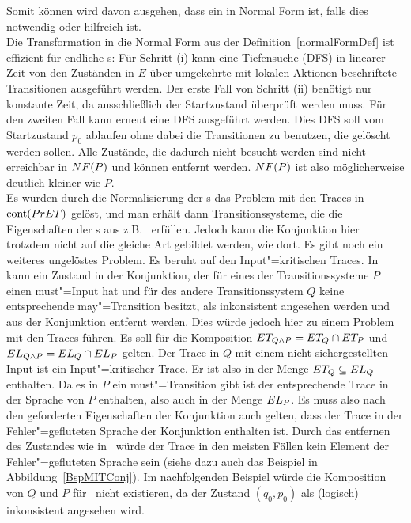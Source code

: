 Somit können wird davon ausgehen, dass ein \MEIO{} in Normal Form ist, falls
dies notwendig oder hilfreich ist.\\
Die Transformation in die Normal Form aus der Definition~\ref{normalFormDef}
ist effizient für endliche \MEIO{}s: Für Schritt (i)  kann eine Tiefensuche
(DFS) in linearer Zeit von den Zuständen in $E$ über umgekehrte mit lokalen
Aktionen beschriftete Transitionen ausgeführt werden. Der erste Fall von
Schritt (ii) benötigt nur konstante Zeit, da ausschließlich der Startzustand
überprüft werden muss. Für den zweiten Fall kann erneut eine DFS ausgeführt
werden. Dies DFS soll vom Startzustand $p_0$ ablaufen ohne dabei die
Transitionen zu benutzen, die gelöscht werden sollen. Alle Zustände, die
dadurch nicht besucht werden sind nicht erreichbar in $NF (P)$ und können
entfernt werden. $NF (P)$ ist also möglicherweise deutlich kleiner wie $P$.\\
Es wurden durch die Normalisierung der \MEIO{}s das Problem mit den Traces in
$\mathrm{cont} (PrET)$ gelöst, und man erhält dann Transitionssysteme, die die
Eigenschaften der \MIA{}s aus z.B.~\cite{Vogler2016MIA3} erfüllen. Jedoch kann
die Konjunktion hier trotzdem nicht auf die gleiche Art gebildet werden, wie dort.
Es gibt noch ein weiteres ungelöstes Problem. Es beruht auf den
Input"=kritischen Traces. In~\cite{Vogler2016MIA3} kann ein Zustand in der
Konjunktion, der für eines der Transitionssysteme $P$ einen must"=Input hat und
für des andere Transitionssystem $Q$ keine entsprechende may"=Transition
besitzt, als inkonsistent angesehen werden und aus der Konjunktion entfernt
werden. Dies würde jedoch hier zu einem Problem mit den Traces führen. Es soll
für die Komposition $ET _{Q\land P} = ET _Q \cap ET _P$ und $EL _{Q\land P}
= EL _Q \cap EL _P$ gelten. Der Trace in $Q$ mit einem nicht sichergestellten
Input ist ein Input"=kritischer Trace. Er ist also in der Menge $ET
_Q\subseteq EL _Q$ enthalten. Da es in $P$ ein must"=Transition gibt ist der
entsprechende Trace in der Sprache von $P$ enthalten, also auch in der Menge
$EL _P$. Es muss also nach den geforderten Eigenschaften der Konjunktion auch
gelten, dass der Trace in der Fehler"=gefluteten Sprache der Konjunktion
enthalten ist. Durch das entfernen des Zustandes wie in~\cite{Vogler2016MIA3}
würde der Trace in den meisten Fällen kein Element der Fehler"=gefluteten
Sprache sein (siehe dazu auch das Beispiel in Abbildung~\ref{BspMITConj}). Im
nachfolgenden Beispiel würde die Komposition von $Q$ und $P$
für~\cite{Vogler2016MIA3} nicht existieren, da der Zustand $(q_0,p_0)$ als
(logisch) inkonsistent angesehen wird.


